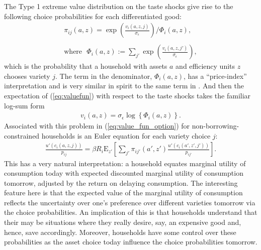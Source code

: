 \documentclass[12pt,pdftex]{article}
\begin{document}
\begin{onehalfspacing}
The Type 1 extreme value distribution on the taste shocks give rise to the following choice probabilities for each differentiated good:
\begin{align}
\pi_{ij}(a, z) = \exp \left( \frac{ v_{i}(a, z, j) }{\sigma_{\epsilon}} \right) \Bigg / \Phi_{i}(a,z), \label{eq:choice-prob} \\
\nonumber \\
\mbox{where} \ \ \ \Phi_{i}(a,z) := \sum_{j'} \exp \left( \frac{ v_{i}(a, z, j') }{\sigma_{\epsilon}} \right), \label{eq:big-phi}
\end{align}
which is the probability that a household with assets $a$ and efficiency units $z$ chooses variety $j$. The term in the denominator, $\Phi_{i}(a,z)$, has a ``price-index'' interpretation and is very similar in spirit to the same term in \citet{eaton2002technology}. And then the expectation of (\ref{eq:valuefun}) with respect to the taste shocks takes the familiar log-sum form
\begin{align}
v_i(a, z) = \sigma_{\epsilon} \log \left\{ \Phi_{i}(a,z)  \right\}. \label{eq:log_sum}
\end{align}
Associated with this problem in (\ref{eq:value_fun_option}) for non-borrowing-constrained households is an Euler equation for each variety choice $j$:
\begin{align}
\frac{u'(c_{i}(a, z, j))}{p_{ij}} = \beta R_{i} \mathrm{E}_{z'} \left[ \sum_{j'} \pi_{ij'}(a', z') \frac{u'(c_{i}(a', z', j'))}{p_{ij'}} \right].
\label{eq:euler_equation}
\end{align}
This has a very natural interpretation: a household equates marginal utility of consumption today with expected discounted marginal utility of consumption tomorrow, adjusted by the return on delaying consumption. The interesting feature here is that the expected value of the marginal utility of consumption reflects the uncertainty over one's preference over different varieties tomorrow via the choice probabilities. An implication of this is that households understand that their may be situations where they really desire, say, an expensive good and, hence, save accordingly. Moreover, households have some control over these probabilities as the asset choice today influence the choice probabilities tomorrow.


\end{onehalfspacing}
\end{document}

